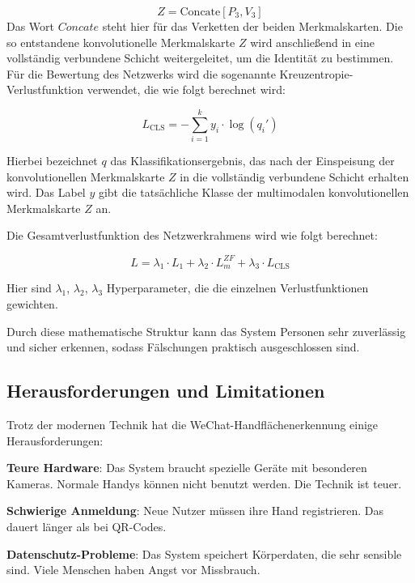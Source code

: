 \documentclass[paper=a4,fontsize=12pt,ngerman]{scrartcl}
\begin{document}
\begin{equation}
Z = \text{Concate}[P_3, V_3]
\end{equation}
Das Wort $Concate$ steht hier für das Verketten der beiden Merkmalskarten. Die so entstandene konvolutionelle Merkmalskarte $Z$ wird anschließend in eine vollständig verbundene Schicht weitergeleitet, um die Identität zu bestimmen. Für die Bewertung des Netzwerks wird die sogenannte Kreuzentropie-Verlustfunktion verwendet, die wie folgt berechnet wird:

\begin{equation}
L_{\text{CLS}} = -\sum_{i=1}^{k} y_i \cdot \log(q_i')
\end{equation}

Hierbei bezeichnet $q$ das Klassifikationsergebnis, das nach der Einspeisung der konvolutionellen Merkmalskarte $Z$ in die vollständig verbundene Schicht erhalten wird. Das Label $y$ gibt die tatsächliche Klasse der multimodalen konvolutionellen Merkmalskarte $Z$ an.

Die Gesamtverlustfunktion des Netzwerkrahmens wird wie folgt berechnet:

\begin{equation}
L = \lambda_1 \cdot L_1 + \lambda_2 \cdot L_{m}^{ZF} + \lambda_3 \cdot L_{\text{CLS}}
\end{equation}

Hier sind $\lambda_1$, $\lambda_2$, $\lambda_3$ Hyperparameter, die die einzelnen Verlustfunktionen gewichten.

Durch diese mathematische Struktur kann das System Personen sehr zuverlässig und sicher erkennen, sodass Fälschungen praktisch ausgeschlossen sind.\cite{pan2024palm}

\vspace{1.5cm}

\subsection{Herausforderungen und Limitationen}
Trotz der modernen Technik hat die WeChat-Handflächenerkennung einige Herausforderungen:

\textbf{Teure Hardware}: Das System braucht spezielle Geräte mit besonderen 
Kameras. Normale Handys können nicht benutzt werden. Die Technik ist teuer.

\textbf{Schwierige Anmeldung}: Neue Nutzer müssen ihre Hand registrieren. 
Das dauert länger als bei QR-Codes.

\textbf{Datenschutz-Probleme}: Das System speichert Körperdaten, die sehr sensible sind. 
Viele Menschen haben Angst vor Missbrauch.
\end{document}
